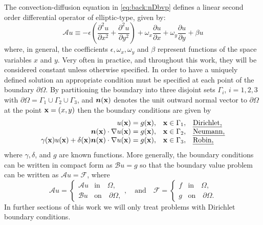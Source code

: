 The convection-diffusion equation in \eqref{eq:back:nDbvp} defines a linear
second order differential operator of elliptic-type, given by:
%
\begin{equation}\label{eq:back:ellipticPDE}
\mathscr{A}u\equiv
-\epsilon\left( \frac{\partial^2 u}{\partial x^2} + \frac{\partial^2 u}{\partial y^2}\right) + \omega_x\frac{\partial u}{\partial x} + \omega_y \frac{\partial u}{\partial y} + \beta u
\end{equation}
where, in general, the coefficients $\epsilon,\omega_x,\omega_y$ and $\beta$
represent functions of the space variables $x$ and $y$. Very often in practice,
and throughout this work, they will be considered constant unless otherwise
specified. In order to have a uniquely defined solution an appropriate condition must be specified at each point of the boundary $\partial\Omega$. By partitioning the boundary into three disjoint sets $\Gamma_i$, $i=1,2,3$ with
$\partial \Omega=\Gamma_1\cup\Gamma_2\cup\Gamma_3$, and $\bm{n}(\mathbf{x})$
denotes the unit outward normal vector to $\partial\Omega$ at the point
$\mathbf{x}=(x,y)$ then the boundary conditions are given by
\begin{equation}
\begin{array}{rrl}
u(\mathbf{x}) = g(\mathbf{x}), & \mathbf{x}\in\Gamma_1, & \text{\emph{Dirichlet,}}\\
\bm{n}(\mathbf{x})\cdot \nabla u(\mathbf{x}) = g(\mathbf{x}),& \mathbf{x}\in\Gamma_2, & \text{\emph{Neumann,}}  \\
\gamma(\mathbf{x})u(\mathbf{x}) + \delta(\mathbf{x})\bm{n}(\mathbf{x})\cdot\nabla u(\mathbf{x}) = g(\mathbf{x}), & \mathbf{x}\in\Gamma_3, & \text{\emph{Robin,}}
\end{array}
\end{equation}
where $\gamma, \delta$, and  $g$ are known functions. More generally, the
boundary conditions can be written in compact form as $\mathscr{B}u=g$ so that the boundary value problem can be written as $\mathcal{A}u=\mathcal{F}$, where
%
\begin{equation}\label{eq:back:ellipticBVP}
\mathcal{A}u=\begin{cases}
\mathscr{A}u &\text{in}\quad \Omega,\\
\mathscr{B}u &\text{on}\quad \partial\Omega,
\end{cases},
\quad\text{and}\quad
\mathcal{F}=\begin{cases}
f &\text{in}\quad \Omega,\\
g &\text{on}\quad \partial\Omega.
\end{cases}
\end{equation}
In further sections of this work we will only treat problems with Dirichlet
boundary conditions.

